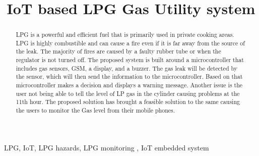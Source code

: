 \documentclass[conference]{IEEEtran}
\begin{document}
\title{IoT based LPG Gas Utility system}

\author{
}


\maketitle

\begin{abstract}
    LPG is a powerful and efficient fuel that is primarily
    used in private cooking areas. LPG is highly combustible
    and can cause a fire even if it is far away from the
    source of the leak. The majority of fires are caused by
    a faulty rubber tube or when the regulator is not turned
    off. The proposed system is built around a microcontroller
    that includes gas sensors, GSM, a display, and a buzzer.
    The gas leak will be detected by the sensor, which will
    then send the information to the microcontroller. Based
    on that microcontroller makes a decision and displays a
    warning message. Another issue is the user not being
    able to tell the level of LP gas in the cylinder causing
    problems at the 11th hour. The proposed solution has
    brought a feasible solution to the same causing the
    users to monitor the Gas level from their mobile phones.
\end{abstract}

\begin{IEEEkeywords}
    LPG, IoT, LPG hazards, LPG monitoring , IoT embedded system
\end{IEEEkeywords}
\end{document}
